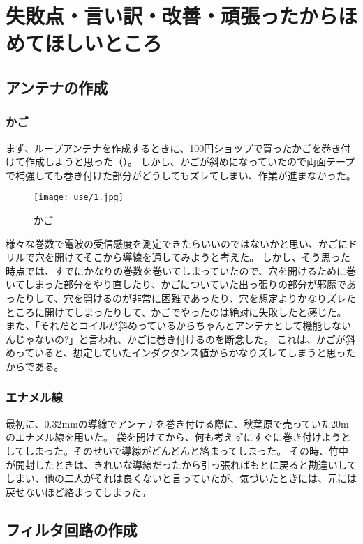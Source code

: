 \documentclass[report.tex]{subfiles}
\begin{document}
\section{失敗点・言い訳・改善・頑張ったからほめてほしいところ}

\subsection{アンテナの作成}

\subsubsection{かご}

まず、ループアンテナを作成するときに、100円ショップで買ったかごを巻き付けて作成しようと思った（）。
しかし、かごが斜めになっていたので両面テープで補強しても巻き付けた部分がどうしてもズレてしまい、作業が進まなかった。

\begin{figure}[H]
	\centering
	\texttt{[image: use/1.jpg]}
	\caption{かご}
	\label{fig:kago}
\end{figure}

様々な巻数で電波の受信感度を測定できたらいいのではないかと思い、かごにドリルで穴を開けてそこから導線を通してみようと考えた。
しかし、そう思った時点では、すでにかなりの巻数を巻いてしまっていたので、穴を開けるために巻いてしまった部分をやり直したり、かごについていた出っ張りの部分が邪魔であったりして、穴を開けるのが非常に困難であったり、穴を想定よりかなりズレたところに開けてしまったりして、かごでやったのは絶対に失敗したと感じた。
また、「それだとコイルが斜めっているからちゃんとアンテナとして機能しないんじゃないの?」と言われ、かごに巻き付けるのを断念した。
これは、かごが斜めっていると、想定していたインダクタンス値からかなりズレてしまうと思ったからである。


\subsubsection{エナメル線}

最初に、0.32mmの導線でアンテナを巻き付ける際に、秋葉原で売っていた20mのエナメル線を用いた。
袋を開けてから、何も考えずにすぐに巻き付けようとしてしまった。そのせいで導線がどんどんと絡まってしまった。
その時、竹中が開封したときは、きれいな導線だったから引っ張ればもとに戻ると勘違いしてしまい、他の二人がそれは良くないと言っていたが、気づいたときには、元には戻せないほど絡まってしまった。

\subsection{フィルタ回路の作成}
\end{document}
